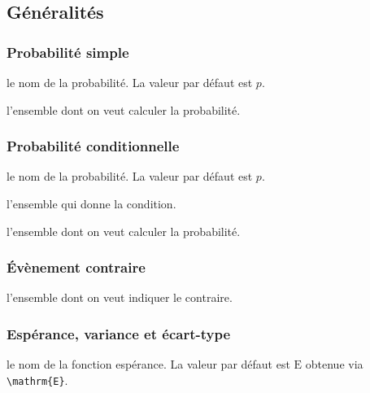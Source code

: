 \documentclass[12pt,a4paper]{book}
\theoremstyle{definition}
\newcommand\extraspace{
	\vspace{0.25em}
}
\begin{document}
{{\subsection{Généralités}

\subsubsection{Probabilité \og simple \fg}




\IDoption{} le nom de la probabilité. La valeur par défaut est $p$.

\IDarg{} l'ensemble dont on veut calculer la probabilité.




\subsubsection{Probabilité conditionnelle}





\extraspace




\IDoption{} le nom de la probabilité. La valeur par défaut est $p$.

 l'ensemble qui donne la condition.

 l'ensemble dont on veut calculer la probabilité.


\subsubsection{Évènement contraire}




\IDarg{} l'ensemble dont on veut indiquer le contraire.


\subsubsection{Espérance, variance et écart-type}




\IDoption{} le nom de la fonction espérance. La valeur par défaut est $\mathrm{E}$ obtenue via \verb#\mathrm{E}#.

}}
\end{document}
